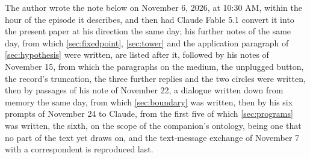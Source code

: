 The author wrote the note below on November 6, 2026, at 10:30 AM, within the hour of the episode it describes, and then had Claude Fable 5.1 convert it into the present paper at his direction the same day; his further notes of the same day, from which \autoref{sec:fixedpoint}, \autoref{sec:tower} and the application paragraph of \autoref{sec:hypothesis} were written, are listed after it, followed by his notes of November 15, from which the paragraphs on the medium, the unplugged button, the record's truncation, the three further replies and the two circles were written, then by passages of his note of November 22, a dialogue written down from memory the same day, from which \autoref{sec:boundary} was written, then by his six prompts of November 24 to Claude, from the first five of which \autoref{sec:programs} was written, the sixth, on the scope of the companion's ontology, being one that no part of the text yet draws on, and the text-message exchange of November 7 with a correspondent is reproduced last.
